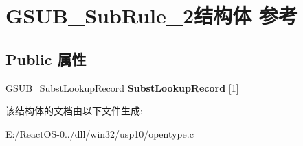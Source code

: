 \hypertarget{struct_g_s_u_b___sub_rule__2}{}\section{G\+S\+U\+B\+\_\+\+Sub\+Rule\+\_\+2结构体 参考}
\label{struct_g_s_u_b___sub_rule__2}
\subsection*{Public 属性}
\begin{DoxyCompactItemize}
\item 
\mbox{\label{struct_g_s_u_b___sub_rule__2_a8bfc904875de5198f352b4eec8d919df}} 
\hyperlink{struct_g_s_u_b___subst_lookup_record}{G\+S\+U\+B\+\_\+\+Subst\+Lookup\+Record} {\bfseries Subst\+Lookup\+Record} \mbox{[}1\mbox{]}
\end{DoxyCompactItemize}


该结构体的文档由以下文件生成\+:\begin{DoxyCompactItemize}
\item 
E\+:/\+React\+O\+S-\/0../dll/win32/usp10/opentype.\+c\end{DoxyCompactItemize}
